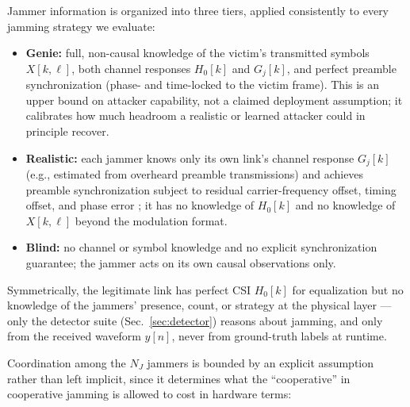 \documentclass[journal]{IEEEtran}
\newcommand{\rar}[1]{{\color{blue}{[#1]}}}
\begin{document}
Jammer information is organized into three tiers, applied consistently to
every jamming strategy we evaluate:
\begin{itemize}
    \item \textbf{Genie:} full, non-causal knowledge of the victim's
    transmitted symbols $X[k,\ell]$, both channel responses $H_0[k]$ and
    $G_j[k]$, and perfect preamble synchronization (phase- and time-locked to
    the victim frame). This is an upper bound on attacker capability, not a
    claimed deployment assumption; it calibrates how much headroom a
    realistic or learned attacker could in principle recover.
    \item \textbf{Realistic:} each jammer knows only its own link's channel
    response $G_j[k]$ (e.g., estimated from overheard preamble
    transmissions) and achieves preamble synchronization subject to residual
    carrier-frequency offset, timing offset, and phase error \rar{parameterize
    as a single "cheap hardware" quality knob}; it has no knowledge of
    $H_0[k]$ and no knowledge of $X[k,\ell]$ beyond the modulation format.
    \item \textbf{Blind:} no channel or symbol knowledge and no explicit
    synchronization guarantee; the jammer acts on its own causal
    observations only.
\end{itemize}
Symmetrically, the legitimate link has perfect CSI $H_0[k]$ for equalization
but no knowledge of the jammers' presence, count, or strategy at the
physical layer — only the detector suite (Sec.~\ref{sec:detector}) reasons
about jamming, and only from the received waveform $y[n]$, never from
ground-truth labels at runtime.

Coordination among the $N_J$ jammers is bounded by an explicit assumption
rather than left implicit, since it determines what the ``cooperative'' in
cooperative jamming is allowed to cost in hardware terms:
\rar{pick and defend one at the meeting — (a) a shared low-rate backhaul
control channel, sufficient to exchange policy parameters or per-round power
allocations but not raw IQ; (b) a shared clock/local-oscillator reference for
phase alignment only, no data exchange; or (c) fully independent agents with
no inter-agent communication at execution time, coordination emerging only
through centralized training (CTDE) and unavailable once deployed. The
current MAPPO/CTDE implementation matches (c) at execution time by
construction — state it as the default tier unless a stronger assumption is
explicitly invoked and justified.}
\end{document}
